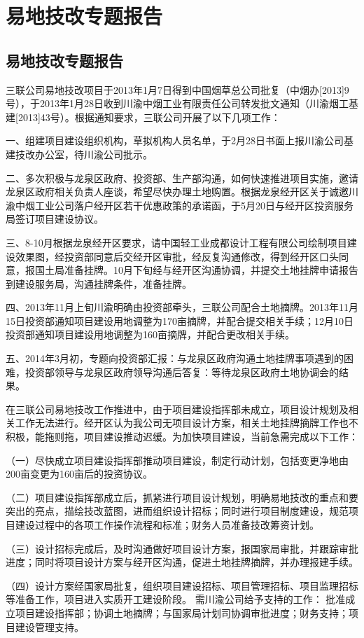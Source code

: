 ﻿\chapter{易地技改专题报告}
\section{易地技改专题报告}
三联公司易地技改项目于2013年1月7日得到中国烟草总公司批复（中烟办[2013]9号），于2013年1月28日收到川渝中烟工业有限责任公司转发批文通知（川渝烟工基建[2013]43号）。根据通知要求，三联公司开展了以下几项工作：

一、组建项目建设组织机构，草拟机构人员名单，于2月28日书面上报川渝公司基建技改办公室，待川渝公司批示。

二、多次积极与龙泉区政府、投资部、生产部沟通，如何快速推进项目实施，邀请龙泉区政府相关负责人座谈，希望尽快办理土地购置。根据龙泉经开区关于诚邀川渝中烟工业公司落户经开区若干优惠政策的承诺函，于5月20日与经开区投资服务局签订项目建设协议。

三、8-10月根据龙泉经开区要求，请中国轻工业成都设计工程有限公司绘制项目建设效果图，经投资部同意后交经开区审批，经反复沟通修改，得到经开区口头同意，报国土局准备挂牌。10月下旬经与经开区沟通协调，并提交土地挂牌申请报告到建设服务局，沟通挂牌条件，准备挂牌。

四、2013年11月上旬川渝明确由投资部牵头，三联公司配合土地摘牌。2013年11月15日投资部通知项目建设用地调整为170亩摘牌，并配合提交相关手续；12月10日投资部通知项目建设用地调整为160亩摘牌，并配合更改相关手续。

五、2014年3月初，专题向投资部汇报：与龙泉区政府沟通土地挂牌事项遇到的困难，投资部领导与龙泉区政府领导沟通后答复：等待龙泉区政府土地协调会的结果。

在三联公司易地技改工作推进中，由于项目建设指挥部未成立，项目设计规划及相关工作无法进行。经开区认为我公司无项目设计方案，相关土地挂牌摘牌工作也不积极，能拖则拖，项目建设推动迟缓。为加快项目建设，当前急需完成以下工作：

（一）尽快成立项目建设指挥部推动项目建设，制定行动计划，包括变更净地由200亩变更为160亩后的投资协议。

（二）项目建设指挥部成立后，抓紧进行项目设计规划，明确易地技改的重点和要突出的亮点，描绘技改蓝图，进而组织设计招标；同时进行项目制度建设，规范项目建设过程中的各项工作操作流程和标准；财务人员准备技改筹资计划。

（三）设计招标完成后，及时沟通做好项目设计方案，报国家局审批，并跟踪审批进度；同时将项目设计方案与经开区沟通，促进土地挂牌摘牌，并办理报建手续。

（四）设计方案经国家局批复，组织项目建设招标、项目管理招标、项目监理招标等准备工作，项目进入实质开工建设阶段。
需川渝公司给予支持的工作：
批准成立项目建设指挥部；协调土地摘牌；与国家局计划司协调审批进度；财务支持；项目建设管理支持。


